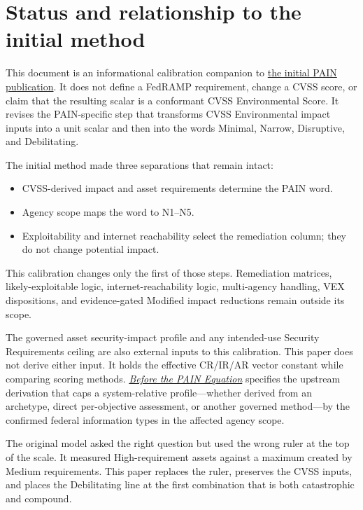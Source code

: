 \documentclass[11pt]{article}
\newcommand{\origpaper}{\href{https://stackarmor.github.io/rfc-fedramp-vdr/vdr-pain-cvss.pdf}{the initial PAIN publication}}
\newcommand{\ceilingpaper}{\href{https://stackarmor.github.io/rfc-fedramp-vdr/vdr-pain-security-requirements.pdf}{\emph{Before the PAIN Equation}}}
\begin{document}
\tableofcontents

\section{Status and relationship to the initial method}

This document is an informational calibration companion to \origpaper{}. It does
not define a FedRAMP requirement, change a CVSS score, or claim that the resulting
scalar is a conformant CVSS Environmental Score. It revises the PAIN-specific step
that transforms CVSS Environmental impact inputs into a unit scalar and then into
the words Minimal, Narrow, Disruptive, and Debilitating.

The initial method made three separations that remain intact:

\begin{itemize}[leftmargin=1.5em]
\item CVSS-derived impact and asset requirements determine the PAIN word.
\item Agency scope maps the word to N1--N5.
\item Exploitability and internet reachability select the remediation column; they
  do not change potential impact.
\end{itemize}

This calibration changes only the first of those steps. Remediation matrices,
likely-exploitable logic, internet-reachability logic, multi-agency handling, VEX
dispositions, and evidence-gated Modified impact reductions remain outside its
scope.

The governed asset security-impact profile and any intended-use Security
Requirements ceiling are also external inputs to this calibration. This paper does
not derive either input. It holds the effective CR/IR/AR vector constant while
comparing scoring methods. \ceilingpaper{} specifies the upstream derivation that
caps a system-relative profile---whether derived from an archetype, direct
per-objective assessment, or another governed method---by the confirmed federal
information types in the affected agency scope.

\begin{plain}
The original model asked the right question but used the wrong ruler at the top of
the scale. It measured High-requirement assets against a maximum created by Medium
requirements. This paper replaces the ruler, preserves the CVSS inputs, and places
the Debilitating line at the first combination that is both catastrophic and
compound.
\end{plain}
\end{document}
